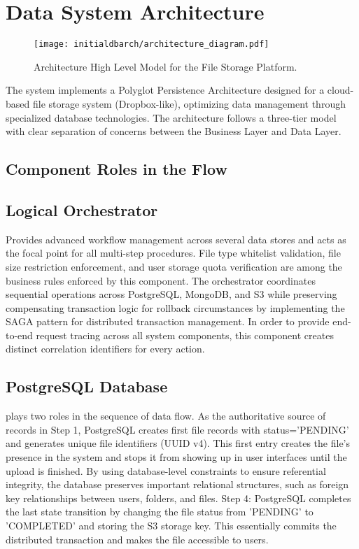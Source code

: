 \section{Data System Architecture}
\begin{figure}[H]
    \centering
    \texttt{[image: initialdbarch/architecture\_diagram.pdf]}
    \caption{Architecture High Level Model for the File Storage Platform.}
    \label{fig:architecture_diagram}
\end{figure}
The system implements a Polyglot Persistence Architecture designed for a cloud-based file storage system (Dropbox-like), optimizing data management through specialized database technologies. The architecture follows a three-tier model with clear separation of concerns between the Business Layer and Data Layer.

\subsection{Component Roles in the Flow}
\subsection{Logical Orchestrator}
Provides advanced workflow management across several data stores and acts as the focal point for all multi-step procedures. File type whitelist validation, file size restriction enforcement, and user storage quota verification are among the business rules enforced by this component. The orchestrator coordinates sequential operations across PostgreSQL, MongoDB, and S3 while preserving compensating transaction logic for rollback circumstances by implementing the SAGA pattern for distributed transaction management. In order to provide end-to-end request tracing across all system components, this component creates distinct correlation identifiers for every action.
\subsection{PostgreSQL Database}
plays two roles in the sequence of data flow. As the authoritative source of records in Step 1, PostgreSQL creates first file records with status='PENDING' and generates unique file identifiers (UUID v4). This first entry creates the file's presence in the system and stops it from showing up in user interfaces until the upload is finished. By using database-level constraints to ensure referential integrity, the database preserves important relational structures, such as foreign key relationships between users, folders, and files. Step 4: PostgreSQL completes the last state transition by changing the file status from 'PENDING' to 'COMPLETED' and storing the S3 storage key. This essentially commits the distributed transaction and makes the file accessible to users.
